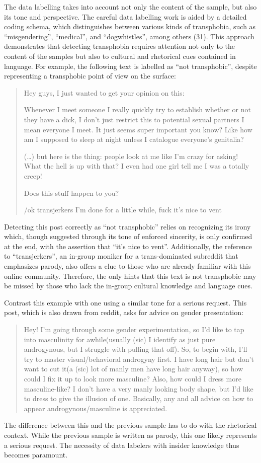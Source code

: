 \documentclass[11pt]{article}
\begin{document}
The data labelling takes into account not only the content of the sample, but also its tone and perspective. The careful data labelling work is aided by a detailed coding schema, which distinguishes between various kinds of transphobia, such as “misgendering”, “medical”, and “dogwhistles”, among others (31). This approach demonstrates that detecting transphobia requires attention not only to the content of the samples but also to cultural and rhetorical cues contained in language. For example, the following text is labelled as “not transphobic”, despite representing a transphobic point of view on the surface:
\begin{quote}
Hey guys, I just wanted to get your opinion on this:

Whenever I meet someone I really quickly try to establish whether or not they have a dick, I don’t just restrict this to potential sexual partners I mean everyone I meet. It just seems super important you know? Like how am I supposed to sleep at night unless I catalogue everyone’s genitalia?

(…) but here is the thing: people look at me like I’m crazy for asking! What the hell is up with that? I even had one girl tell me I was a totally creep!

Does this stuff happen to you?

/ok transjerkers I’m done for a little while, fuck it’s nice to vent
\end{quote}
Detecting this post correctly as “not transphobic” relies on recognizing its irony which, though suggested through its tone of enforced sincerity, is only confirmed at the end, with the assertion that “it’s nice to vent”. Additionally, the reference to “transjerkers”, an in-group moniker for a trans-dominated subreddit that emphasizes parody, also offers a clue to those who are already familiar with this online community. Therefore, the only hints that this text is not transphobic may be missed by those who lack the in-group cultural knowledge and language cues.

Contrast this example with one using a similar tone for a serious request. This post, which is also drawn from reddit, asks for advice on gender presentation:
\begin{quote}
Hey! I’m going through some gender experimentation, so I’d like to tap into masculinity for awhile(usually (sic) I identify as just pure androgynous, but I struggle with pulling that off). So, to begin with, I’ll try to master visual/behavioral androgyny first. I have long hair but don’t want to cut it(a (sic) lot of manly men have long hair anyway), so how could I fix it up to look more masculine? Also, how could I dress more masculine-like? I don’t have a very manly looking body shape, but I’d like to dress to give the illusion of one. Basically, any and all advice on how to appear androgynous/masculine is appreciated.
\end{quote}
The difference between this and the previous sample has to do with the rhetorical context. While the previous sample is written as parody, this one likely represents a serious request. The necessity of data labelers with insider knowledge thus becomes paramount.
\end{document}
